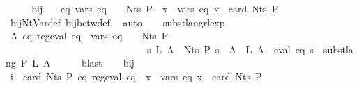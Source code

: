 \begin{isabellebody}
%
\isadelimproof
%
\endisadelimproof
%
\isatagproof
{}\isamarkupfalse%
\ {\isacharminus}{\kern0pt}\isanewline
\ \ \isamarkupfalse%
\ bij{\isacharunderscore}{\kern0pt}{\isasymgamma}{\isacharunderscore}{\kern0pt}{\isasymgamma}{\isacharprime}{\kern0pt}\ \isamarkupfalse%
\ {\isacharasterisk}{\kern0pt}{\isacharcolon}{\kern0pt}\ {\isachardoublequoteopen}{\isasymAnd}eq{\isachardot}{\kern0pt}\ vars\ eq\ {\isasymsubseteq}\ {\isasymgamma}{\isacharprime}{\kern0pt}\ {\isacharbackquote}{\kern0pt}\ Nts\ P\ {\isasymLongrightarrow}\ {\isasymforall}x\ {\isasymin}\ vars\ eq{\isachardot}{\kern0pt}\ x\ {\isacharless}{\kern0pt}\ card\ {\isacharparenleft}{\kern0pt}Nts\ P{\isacharparenright}{\kern0pt}{\isachardoublequoteclose}\isanewline
\ \ \ \ \isamarkupfalse%
\ bij{\isacharunderscore}{\kern0pt}Nt{\isacharunderscore}{\kern0pt}Var{\isacharunderscore}{\kern0pt}def\ bij{\isacharunderscore}{\kern0pt}betw{\isacharunderscore}{\kern0pt}def\ \isamarkupfalse%
\ auto\isanewline
\ \ \isamarkupfalse%
\ subst{\isacharunderscore}{\kern0pt}lang{\isacharunderscore}{\kern0pt}rlexp\ \isamarkupfalse%
\ {\isachardoublequoteopen}{\isasymforall}A{\isachardot}{\kern0pt}\ {\isasymexists}eq{\isachardot}{\kern0pt}\ reg{\isacharunderscore}{\kern0pt}eval\ eq\ {\isasymand}\ vars\ eq\ {\isasymsubseteq}\ {\isasymgamma}{\isacharprime}{\kern0pt}\ {\isacharbackquote}{\kern0pt}\ Nts\ P\ {\isasymand}\isanewline
\ \ \ \ \ \ \ \ \ \ \ \ \ \ \ \ \ \ \ \ \ \ \ \ \ \ \ \ \ {\isacharparenleft}{\kern0pt}{\isasymforall}s\ L{\isachardot}{\kern0pt}\ {\isacharparenleft}{\kern0pt}{\isasymforall}A\ {\isasymin}\ Nts\ P{\isachardot}{\kern0pt}\ s\ {\isacharparenleft}{\kern0pt}{\isasymgamma}{\isacharprime}{\kern0pt}\ A{\isacharparenright}{\kern0pt}\ {\isacharequal}{\kern0pt}\ L\ A{\isacharparenright}{\kern0pt}\ {\isasymlongrightarrow}\ eval\ eq\ s\ {\isacharequal}{\kern0pt}\ subst{\isacharunderscore}{\kern0pt}lang\ P\ L\ A{\isacharparenright}{\kern0pt}{\isachardoublequoteclose}\isanewline
\ \ \ \ \isamarkupfalse%
\ blast\isanewline
\ \ \isamarkupfalse%
\ bij{\isacharunderscore}{\kern0pt}{\isasymgamma}{\isacharunderscore}{\kern0pt}{\isasymgamma}{\isacharprime}{\kern0pt}\ {\isacharasterisk}{\kern0pt}\ \isamarkupfalse%
\ {\isachardoublequoteopen}{\isasymforall}i\ {\isacharless}{\kern0pt}\ card\ {\isacharparenleft}{\kern0pt}Nts\ P{\isacharparenright}{\kern0pt}{\isachardot}{\kern0pt}\ {\isasymexists}eq{\isachardot}{\kern0pt}\ reg{\isacharunderscore}{\kern0pt}eval\ eq\ {\isasymand}\ {\isacharparenleft}{\kern0pt}{\isasymforall}x\ {\isasymin}\ vars\ eq{\isachardot}{\kern0pt}\ x\ {\isacharless}{\kern0pt}\ card\ {\isacharparenleft}{\kern0pt}Nts\ P{\isacharparenright}{\kern0pt}{\isacharparenright}{\kern0pt}\isanewline

\end{isabellebody}

